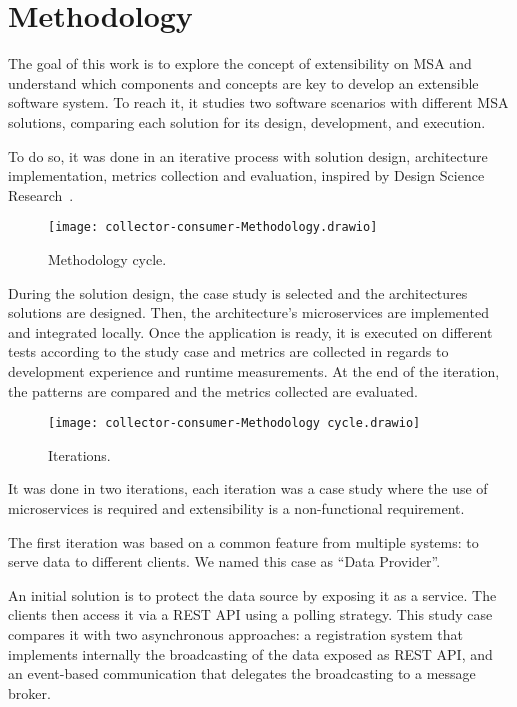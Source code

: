 
\chapter{Methodology}

The goal of this work is to explore the concept of extensibility on MSA and understand which components and concepts are key to develop an extensible software system. To reach it, it studies two software scenarios with different MSA solutions, comparing each solution for its design, development, and execution.

To do so, it was done in an iterative process with solution design, architecture implementation, metrics collection and evaluation, inspired by Design Science Research~\cite{DesignParad}.

\begin{figure}
    \centering
    \texttt{[image: collector-consumer-Methodology.drawio]}
    \caption{Methodology cycle.\label{fig:subfigures}}
\end{figure}

During the solution design, the case study is selected and the architectures solutions are designed. Then, the architecture's microservices are implemented and integrated locally. Once the application is ready, it is executed on different tests according to the study case and metrics are collected in regards to development experience and runtime measurements. At the end of the iteration, the patterns are compared and the metrics collected are evaluated.

\begin{figure}
    \centering
    \texttt{[image: collector-consumer-Methodology cycle.drawio]}
    \caption{Iterations.\label{fig:subfigures}}
\end{figure}

It was done in two iterations, each iteration was a case study where the use of microservices is required and extensibility is a non-functional requirement.

The first iteration was based on a common feature from multiple systems: to serve data to different clients. We named this case as “Data Provider”.

An initial solution is to protect the data source by exposing it as a service. The clients then access it via a REST API using a polling strategy. This study case compares it with two asynchronous approaches: a registration system that implements internally the broadcasting of the data exposed as REST API, and an event-based communication that delegates the broadcasting to a message broker.

